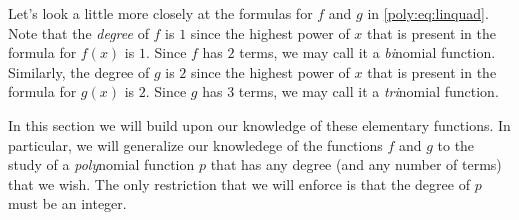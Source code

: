 Let's look a little more closely at the formulas for $f$ and $g$ in 
\cref{poly:eq:linquad}. Note that the \emph{degree} 
of $f$ is $1$ since the highest power of $x$ that is present in the 
formula for $f(x)$ is $1$. Since $f$ has $2$ terms, we may call it 
a \emph{bi}nomial function. Similarly, the degree of $g$ is $2$ since
the highest power of $x$ that is present in the formula for $g(x)$ 
is $2$. Since $g$ has $3$ terms, we may call it a \emph{tri}nomial 
function.

In this section we will build upon our knowledge of these elementary
functions. In particular, we will generalize our knowledege of 
the functions $f$ and $g$ 
to the study of a \emph{poly}nomial function $p$ that has any degree (and 
any number of terms) that we wish. The only restriction that we will 
enforce is that the degree of $p$ must be an integer.

